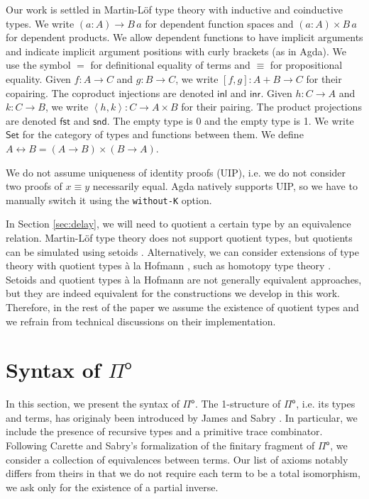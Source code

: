 \documentclass[runningheads,a4paper]{llncs}
\newcommand{\Pio}{\ensuremath{\mathsf{\Pi}^{\mathsf{o}}}}
\newcommand{\Set}{\mathsf{Set}}
\newcommand{\copair}[2]{[#1,#2]}
\newcommand{\pair}[2]{\left< #1,#2 \right>}
\newcommand{\inl}{\mathsf{inl}}
\newcommand{\inr}{\mathsf{inr}}
\newcommand{\fst}{\mathsf{fst}}
\newcommand{\snd}{\mathsf{snd}}
\begin{document}
Our work is settled in Martin-L\"of type theory with inductive and
coinductive types. We write $(a : A) \to B \,a$ for dependent function
spaces and $(a : A) \times B \,a$ for dependent products. We allow
dependent functions to have implicit arguments and indicate implicit
argument positions with curly brackets (as in Agda). We use the
symbol $=$ for definitional equality of terms and $\equiv$ for
propositional equality. Given $f : A \to C$ and
$g : B \to C$, we write $\copair f g : A + B \to C$ for their
copairing. The coproduct injections are denoted $\inl$ and $\inr$.
Given $h : C \to A$ and $k : C \to B$, we write
$\pair h k : C \to A \times B$ for their pairing. The product
projections are denoted $\fst$ and $\snd$. The empty type is 0 and the
empty type is 1. We write $\Set$ for the category of
types and functions between them.
We define $A \leftrightarrow B = (A \to B) \times (B \to A)$.

We do not assume uniqueness of identity proofs
(UIP), i.e. we do not consider two proofs of $x \equiv y$ necessarily
equal. Agda natively supports UIP, so we have to manually switch it
using the \verb|without-K| option.

In Section \ref{sec:delay}, we will need to quotient a certain type by
an equivalence relation. Martin-L\"of type theory does not support
quotient types, but quotients can be simulated using setoids
\cite{BartheCP03}. Alternatively, we can consider extensions of type theory with
quotient types \`a la Hofmann \cite{Hofmann}, such as homotopy type
theory \cite{Hott}. Setoids and quotient types \`a la
Hofmann are not generally equivalent approaches, but they are indeed
equivalent for the constructions we develop in this work. Therefore,
in the rest of the paper we assume the existence of quotient types and
we refrain from technical discussions on their implementation.


\section{Syntax of \Pio}\label{sec:syntax}

In this section, we present the syntax of \Pio. The 1-structure of
\Pio, i.e. its types and terms, has originaly been introduced by James
and Sabry \cite{JamesS12}. In particular, we include the presence of
recursive types and a primitive trace combinator.  Following Carette
and Sabry's formalization of the finitary fragment of \Pio, we
consider a collection of equivalences between terms. Our list of
axioms notably differs from theirs in that we do not require each term to be
a total isomorphism, we ask only for the existence of a partial
inverse. 
\end{document}
